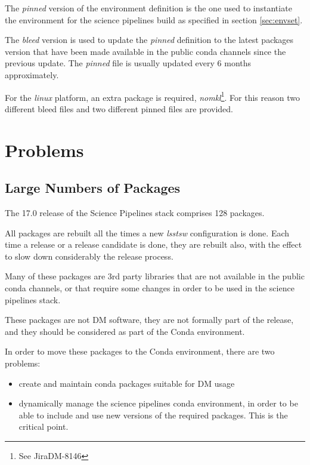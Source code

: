 The \textit{pinned} version of the environment definition is the one used to instantiate the environment for the science pipelines build as specified in section \ref{sec:envset}.

The \textit{bleed} version is used to update the \textit{pinned} definition to the latest packages version that have been made available in the public conda channels since the previous update.
The \textit{pinned} file is usually updated every 6 months approximately.

For the \textit{linux} platform, an extra package is required, \textit{nomkl}\footnote{See Jira{DM-8146}}. For this reason two different bleed files and two different pinned files are provided.


\newpage
\section{Problems}

\subsection{Large Numbers of Packages} \label{sec:high}

The 17.0 release of the Science Pipelines stack comprises 128 packages.

All packages are rebuilt all the times a new \textit{lsstsw} configuration is done. 
Each time a release or a release candidate is done, they are rebuilt also, with the effect to slow down considerably the release process.

Many of these packages are 3rd party libraries that are not available in the public conda channels, or that require some changes in order to be used in the science pipelines stack.

These packages are not DM software, they are not formally part of the release, and they should be considered as part of the Conda environment.

In order to move these packages to the Conda environment, there are two problems:

\begin{itemize}
\item create and maintain conda packages suitable for DM usage
\item dynamically manage the science pipelines conda environment, in order to be able to include and use new versions of the required packages. This is the critical point.
\end{itemize}

